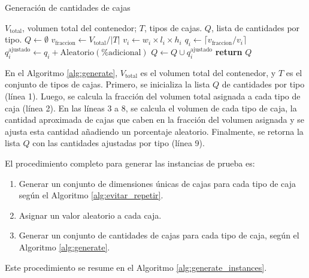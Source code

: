 \begin{algorithm}[H]
    \caption{Generación de cantidades de cajas}
    \label{alg:generate}
    \begin{algorithmic}[1]
        \Require $V_{\text{total}}$, volumen total del contenedor; $T$, tipos de cajas.
        \Ensure $Q$, lista de cantidades por tipo.
        \State $Q \gets \emptyset$
        \State $v_{\text{fraccion}} \gets V_{\text{total}} / |T|$ 
        \State $v_i \gets w_i \times l_i \times h_i$ 
        \State $q_i \gets \lceil v_{\text{fraccion}} / v_i \rceil$
        \State $q_i^{\text{ajustado}} \gets q_i + \text{Aleatorio}(\% \text{adicional})$ 
        \State $Q \gets Q \cup q_i^{\text{ajustado}}$
        \EndFor
        \State \textbf{return} $Q$
    \end{algorithmic}
\end{algorithm}

En el Algoritmo \ref{alg:generate}, $V_{\text{total}}$ es el volumen total del contenedor, y $T$ es el conjunto de tipos de cajas. Primero, se inicializa la lista $Q$ de cantidades por tipo (línea 1). Luego, se calcula la fracción del volumen total asignada a cada tipo de caja (línea 2). En las líneas 3 a 8, se calcula el volumen de cada tipo de caja, la cantidad aproximada de cajas que caben en la fracción del volumen asignada y se ajusta esta cantidad añadiendo un porcentaje aleatorio. Finalmente, se retorna la lista $Q$ con las cantidades ajustadas por tipo (línea 9).

El procedimiento completo para generar las instancias de prueba es:

\begin{enumerate}
    \item Generar un conjunto de dimensiones únicas de cajas para cada tipo de caja según el Algoritmo \ref{alg:evitar_repetir}.
    \item Asignar un valor aleatorio a cada caja.
    \item Generar un conjunto de cantidades de cajas para cada tipo de caja, según el Algoritmo \ref{alg:generate}.
\end{enumerate}

Este procedimiento se resume en el Algoritmo \ref{alg:generate_instances}.

